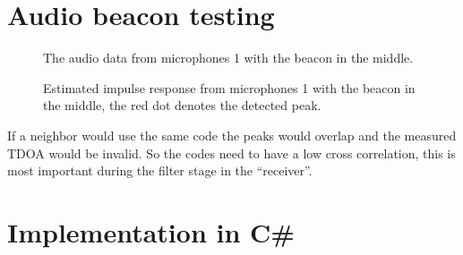 \documentclass[final]{scrreprt} %
\begin{document}
\section{Audio beacon testing}
\begin{figure}[H]
	\centering
	\setlength\figureheight{4cm}
    	\setlength{}
	
	\caption{The audio data from microphones 1 with the beacon in the middle.}
	\label{fig:one-signal}
\end{figure}
\begin{figure}[H]
	\centering
	\setlength\figureheight{4cm}
    	\setlength{}
	
	\caption{Estimated impulse response from microphones 1 with the beacon in the middle, the red dot denotes the detected peak.}
	\label{fig:impulse-with-peak}
\end{figure}
If a neighbor would use the same code the peaks would overlap and the measured TDOA would be invalid.
So the codes need to have a low cross correlation, this is most important during the filter stage in the ``receiver''.
\section{Implementation in C\#}
\end{document}
